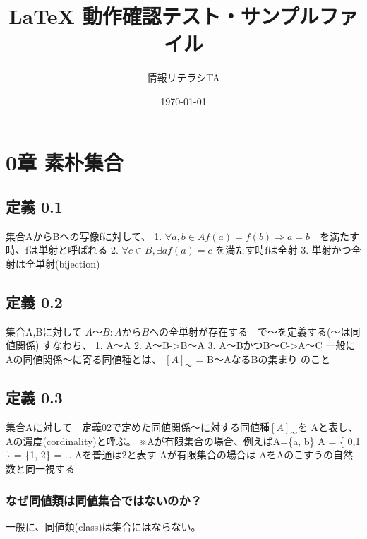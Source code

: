 \documentclass[a4j,12pt]{jreport}
\title{ {\LaTeX} 動作確認テスト・サンプルファイル}
\author{情報リテラシTA}
\date{\today}
\begin{document}
\maketitle


\def\tightlist{\itemsep1pt\parskip0pt\parsep0pt}
\section{0章 素朴集合}\label{ux7ae0-ux7d20ux6734ux96c6ux5408}

\subsection{定義 0.1}\label{ux5b9aux7fa9-0.1}

集合AからBへの写像fに対して、 1.
\(\forall{} a, b \in A f(a) = f(b) \Rightarrow{} a = b\)　を満たす時、fは単射と呼ばれる
2. \(\forall{} c \in B, \exists a f(a) = c\) を満たす時fは全射 3.
単射かつ全射は全単射(bijection)

\subsection{定義 0.2}\label{ux5b9aux7fa9-0.2}

集合A,Bに対して
\(A〜B : AからBへの全単射が存在する\)　で〜を定義する(〜は同値関係)
すなわち、 1. A〜A 2. A〜B-\textgreater{}B〜A 3.
A〜BかつB〜C-\textgreater{}A〜C 一般にAの同値関係〜に寄る同値種とは、
\([A]_〜\) = B〜AなるBの集まり のこと

\subsection{定義 0.3}\label{ux5b9aux7fa9-0.3}

集合Aに対して　定義02で定めた同値関係〜に対する同値種\([A]_〜\)を
\textbar{}A\textbar{}と表し、 Aの濃度(cordinality)と呼ぶ。
※Aが有限集合の場合、例えばA=\{a, b\} \textbar{}A\textbar{} =
\textbar{}\{ 0,1 \}\textbar{} = \textbar{}\{1, 2\}\textbar{} = \ldots{}
\textbar{}A\textbar{}を普通は2と表す Aが有限集合の場合は
\textbar{}A\textbar{}をAのこすうの自然数と同一視する

\subsubsection{なぜ同値類は同値集合ではないのか？}\label{ux306aux305cux540cux5024ux985eux306fux540cux5024ux96c6ux5408ux3067ux306fux306aux3044ux306eux304b}

一般に、同値類(class)は集合にはならない。
\end{document}
